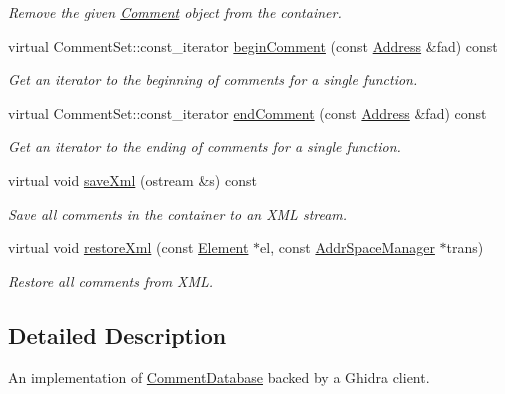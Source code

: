 \begin{DoxyCompactItemize}
\begin{DoxyCompactList}\small\item\em Remove the given \mbox{\hyperlink{class_comment}{Comment}} object from the container. \end{DoxyCompactList}\item 
virtual Comment\+Set\+::const\+\_\+iterator \mbox{\hyperlink{class_comment_database_ghidra_a3fc25277281f61f2aa851b4bbb1e33f1}{begin\+Comment}} (const \mbox{\hyperlink{class_address}{Address}} \&fad) const
\begin{DoxyCompactList}\small\item\em Get an iterator to the beginning of comments for a single function. \end{DoxyCompactList}\item 
virtual Comment\+Set\+::const\+\_\+iterator \mbox{\hyperlink{class_comment_database_ghidra_aab66e37f898fbd4f15dedfe11d024b9c}{end\+Comment}} (const \mbox{\hyperlink{class_address}{Address}} \&fad) const
\begin{DoxyCompactList}\small\item\em Get an iterator to the ending of comments for a single function. \end{DoxyCompactList}\item 
virtual void \mbox{\hyperlink{class_comment_database_ghidra_aed8e6973a2bfb1077970a2db93e4bde1}{save\+Xml}} (ostream \&s) const
\begin{DoxyCompactList}\small\item\em Save all comments in the container to an X\+ML stream. \end{DoxyCompactList}\item 
virtual void \mbox{\hyperlink{class_comment_database_ghidra_ab787aca7833ed057ba06d82fc258e738}{restore\+Xml}} (const \mbox{\hyperlink{class_element}{Element}} $\ast$el, const \mbox{\hyperlink{class_addr_space_manager}{Addr\+Space\+Manager}} $\ast$trans)
\begin{DoxyCompactList}\small\item\em Restore all comments from X\+ML. \end{DoxyCompactList}\end{DoxyCompactItemize}


\subsection{Detailed Description}
An implementation of \mbox{\hyperlink{class_comment_database}{Comment\+Database}} backed by a Ghidra client. 

